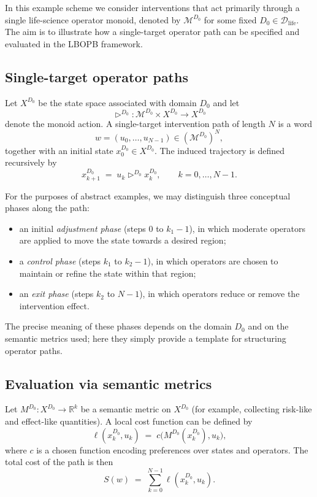 \documentclass[11pt]{book}
\theoremstyle{plain}
\theoremstyle{definition}
\theoremstyle{remark}
\begin{document}
In this example scheme we consider interventions that act primarily
through a single life-science operator monoid, denoted by
$\mathcal{M}^{D_{0}}$ for some fixed $D_{0} \in \mathcal{D}_{\mathrm{life}}$.
The aim is to illustrate how a single-target operator path can be
specified and evaluated in the LBOPB framework.

\subsection*{Single-target operator paths}

Let $X^{D_{0}}$ be the state space associated with domain $D_{0}$ and
let
\[
  \triangleright^{D_{0}} \colon
  \mathcal{M}^{D_{0}} \times X^{D_{0}} \to X^{D_{0}}
\]
denote the monoid action. A single-target intervention path of length
$N$ is a word
\[
  w = (u_{0},\dots,u_{N-1}) \in (\mathcal{M}^{D_{0}})^{N},
\]
together with an initial state $x^{D_{0}}_{0} \in X^{D_{0}}$. The
induced trajectory is defined recursively by
\[
  x^{D_{0}}_{k+1}
  \;=\;
  u_{k} \triangleright^{D_{0}} x^{D_{0}}_{k},
  \qquad k = 0,\dots,N-1.
\]

For the purposes of abstract examples, we may distinguish three
conceptual phases along the path:

\begin{itemize}
  \item an initial \emph{adjustment phase} (steps $0$ to $k_{1}-1$),
        in which moderate operators are applied to move the state
        towards a desired region;
  \item a \emph{control phase} (steps $k_{1}$ to $k_{2}-1$), in which
        operators are chosen to maintain or refine the state within
        that region;
  \item an \emph{exit phase} (steps $k_{2}$ to $N-1$), in which
        operators reduce or remove the intervention effect.
\end{itemize}

The precise meaning of these phases depends on the domain $D_{0}$ and
on the semantic metrics used; here they simply provide a template for
structuring operator paths.

\subsection*{Evaluation via semantic metrics}

Let $M^{D_{0}} \colon X^{D_{0}} \to \mathbb{R}^{k}$ be a semantic
metric on $X^{D_{0}}$ (for example, collecting risk-like and
effect-like quantities). A local cost function can be defined by
\[
  \ell(x^{D_{0}}_{k}, u_{k})
  \;=\;
  c\bigl( M^{D_{0}}(x^{D_{0}}_{k}), u_{k} \bigr),
\]
where $c$ is a chosen function encoding preferences over states and
operators. The total cost of the path is then
\[
  S(w)
  \;=\;
  \sum_{k=0}^{N-1} \ell(x^{D_{0}}_{k}, u_{k}).
\]
\end{document}
